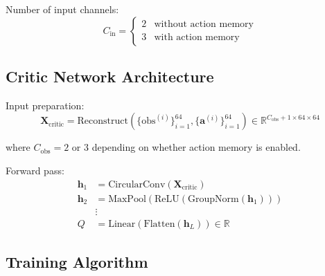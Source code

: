 \documentclass[11pt,a4paper]{article}
\newcommand{\R}{\mathbb{R}}
\theoremstyle{definition}
\begin{document}
Number of input channels:
\begin{equation}
    C_{\text{in}} = \begin{cases}
        2 & \text{without action memory} \\
        3 & \text{with action memory}
    \end{cases}
\end{equation}

\subsection{Critic Network Architecture}

Input preparation:
\begin{equation}
    \mathbf{X}_{\text{critic}} = \text{Reconstruct}(\{\text{obs}^{(i)}\}_{i=1}^{64}, \{\mathbf{a}^{(i)}\}_{i=1}^{64}) \in \R^{C_{\text{obs}} + 1 \times 64 \times 64}
\end{equation}

where $C_{\text{obs}} = 2$ or $3$ depending on whether action memory is enabled.

Forward pass:
\begin{align}
    \mathbf{h}_1 &= \text{CircularConv}(\mathbf{X}_{\text{critic}}) \\
    \mathbf{h}_2 &= \text{MaxPool}(\text{ReLU}(\text{GroupNorm}(\mathbf{h}_1))) \\
    &\vdots \\
    Q &= \text{Linear}(\text{Flatten}(\mathbf{h}_L)) \in \R
\end{align}

\subsection{Training Algorithm}
\end{document}
